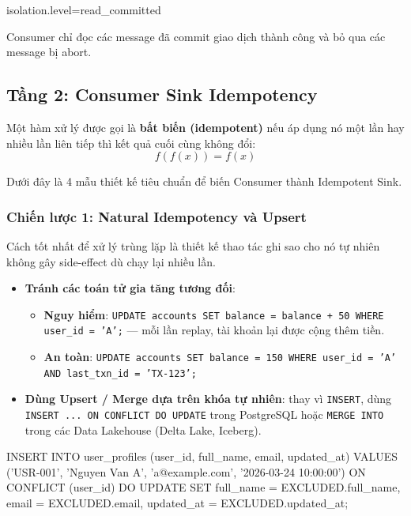 \documentclass[12pt]{article}
\begin{document}
\begin{aivnplainbox}
isolation.level=read_committed
\end{aivnplainbox}

Consumer chỉ đọc các message đã commit giao dịch thành công và bỏ qua các message bị abort.

\subsection{Tầng 2: Consumer Sink Idempotency}

Một hàm xử lý được gọi là \textbf{bất biến (idempotent)} nếu áp dụng nó một lần hay nhiều lần liên tiếp thì kết quả cuối cùng không đổi:
\[
f(f(x)) = f(x)
\]

Dưới đây là 4 mẫu thiết kế tiêu chuẩn để biến Consumer thành Idempotent Sink.

\subsubsection{Chiến lược 1: Natural Idempotency và Upsert}

Cách tốt nhất để xử lý trùng lặp là thiết kế thao tác ghi sao cho nó tự nhiên không gây side-effect dù chạy lại nhiều lần.

\begin{itemize}
    \item \textbf{Tránh các toán tử gia tăng tương đối}:
    \begin{itemize}
        \item \textbf{Nguy hiểm}: \texttt{UPDATE accounts SET balance = balance + 50 WHERE user\_id = 'A';} --- mỗi lần replay, tài khoản lại được cộng thêm tiền.
        \item \textbf{An toàn}: \texttt{UPDATE accounts SET balance = 150 WHERE user\_id = 'A' AND last\_txn\_id = 'TX-123';}
    \end{itemize}
    \item \textbf{Dùng Upsert / Merge dựa trên khóa tự nhiên}: thay vì \texttt{INSERT}, dùng \texttt{INSERT ... ON CONFLICT DO UPDATE} trong PostgreSQL hoặc \texttt{MERGE INTO} trong các Data Lakehouse (Delta Lake, Iceberg).
\end{itemize}

\begin{aivnsqlbox}
INSERT INTO user_profiles (user_id, full_name, email, updated_at)
VALUES ('USR-001', 'Nguyen Van A', 'a@example.com', '2026-03-24 10:00:00')
ON CONFLICT (user_id)
DO UPDATE SET
    full_name  = EXCLUDED.full_name,
    email      = EXCLUDED.email,
    updated_at = EXCLUDED.updated_at;
\end{aivnsqlbox}
\end{document}
